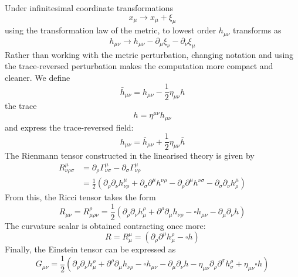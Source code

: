 \documentclass[binding=0.6cm, LaM]{sapthesis}
\begin{document}
	Under infinitesimal coordinate transformations
                 \[
			x_{\mu} \rightarrow x_{\mu} + \xi_{\mu}
                \]
	using the transformation law of the metric, to lowest order $h_{\mu\nu}$ transforms as	
		\[
			h_{\mu\nu} \rightarrow h_{\mu\nu} - \partial_{\mu}\xi_{\nu} - \partial_{\nu}\xi_{\mu}
		\]
	Rather than working with the metric perturbation, changing notation and using the trace-reversed perturbation 
	makes the computation more compact and cleaner. We define
		\begin{equation}
			{\bar h}_{\mu\nu} = h_{\mu\nu} - \frac{1}{2}\eta_{\mu\nu}h
		\end{equation}
	the trace
		\begin{equation}
			h = \eta^{\mu\nu}h_{\mu\nu}
		\end{equation}
	and express the trace-reversed field:
		\begin{equation}
			h_{\mu\nu} = {\bar h}_{\mu\nu} + \frac{1}{2}\eta_{\mu\nu}{\bar h}
		\end{equation}
	The Rienmann tensor constructed in the linearised theory is given by
		\begin{align}
			R^{\mu}_{\nu\rho\sigma} &= \partial_{\rho} \Gamma^{\mu}_{\nu\sigma} - \partial_{\sigma}\Gamma^{\mu}_{\nu\rho}  \\
				       &= \frac{1}{2} (\partial_{\rho}\partial_{\nu}h^{\mu}_{\nu\rho} + \partial_{\sigma}\partial^{\mu}h^{\nu\rho} - \partial_{\rho}\partial^{\mu}h^{\nu\sigma} - \partial_{\sigma}\partial_{\nu}h^{\mu}_{\rho})
		\end{align}
	From this, the Ricci tensor takes the form
		\begin{equation}
			R_{\mu\nu} = R^{\rho}_{\mu\rho\nu} = \frac{1}{2}(\partial_{\rho}\partial_{\nu}h^{\rho}_{\mu} + \partial^{\rho}\partial_{\mu}h_{\nu\rho} - \square h_{\mu\nu} - \partial_{\mu}\partial_{\nu}h)
		\end{equation}
	The curvature scalar is obtained contracting once more:
		\begin{equation}
			R = R^{\mu}_{\mu} = (\partial_{\rho}\partial^{\mu}h^{\rho}_{\mu} - \square h)
		\end{equation}
	Finally, the Einstein tensor can be expressed as
		\begin{equation}
			G_{\mu\nu} = \frac{1}{2}(\partial_{\rho}\partial_{\nu}h^{\rho}_{\mu} + \partial^{\rho}\partial_{\mu}h_{\nu\rho} - \square h_{\mu\nu} - \partial_{\mu}\partial_{\nu}h - \eta_{\mu\nu}\partial_{\rho}\partial^{\sigma}h^{\rho}_{\sigma} + \eta_{\mu\nu}\square h)
		\end{equation}
\end{document}
